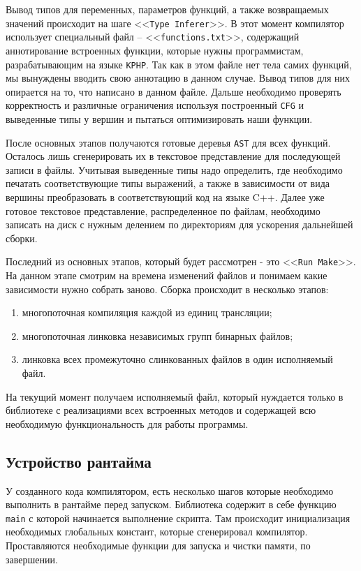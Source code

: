 Вывод типов для переменных, параметров функций, а также возвращаемых значений происходит на шаге <<\verb|Type Inferer|>>.
В этот момент компилятор использует специальный файл -- <<\verb|functions.txt|>>, содержащий аннотирование встроенных функции, которые нужны программистам, разрабатывающим на языке \verb|KPHP|.
Так как в этом файле нет тела самих функций, мы вынуждены вводить свою аннотацию в данном случае.
Вывод типов для них опирается на то, что написано в данном файле.
Дальше необходимо проверять корректность и различные ограничения используя построенный \verb|CFG| и выведенные типы у вершин и пытаться оптимизировать наши функции.

После основных этапов получаются готовые деревья \verb|AST| для всех функций.
Осталось лишь сгенерировать их в текстовое представление для последующей записи в файлы.
Учитывая выведенные типы надо определить, где необходимо печатать соответствующие типы выражений, а также в зависимости от вида вершины преобразовать в соответствующий код на языке C++.
Далее уже готовое текстовое представление, распределенное по файлам, необходимо записать на диск с нужным делением по директориям для ускорения дальнейшей сборки.

Последний из основных этапов, который будет рассмотрен - это <<\verb|Run Make|>>.
На данном этапе смотрим на времена изменений файлов и понимаем какие зависимости нужно собрать заново.
Сборка происходит в несколько этапов:
\begin{enumerate}
  \item многопоточная компиляция каждой из единиц трансляции;
  \item многопоточная линковка независимых групп бинарных файлов;
  \item линковка всех промежуточно слинкованных файлов в один исполняемый файл.
\end{enumerate}

На текущий момент получаем исполняемый файл, который нуждается только в библиотеке с реализациями всех встроенных методов и содержащей всю необходимую функциональность для работы программы.

\subsection{Устройство рантайма}
\label{sec2:runtime_principle}
У созданного кода компилятором, есть несколько шагов которые необходимо выполнить в рантайме перед запуском.
Библиотека содержит в себе функцию \verb|main| с которой начинается выполнение скрипта.
Там происходит инициализация необходимых глобальных констант, которые сгенерировал компилятор.
Проставляются необходимые функции для запуска и чистки памяти, по завершении.

